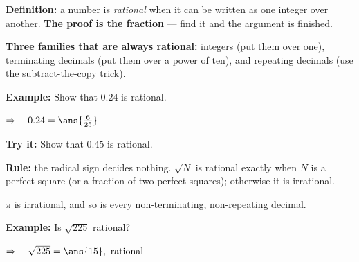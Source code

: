 \documentclass[12pt]{article}
\begin{document}


\begin{formulabox}
\textbf{Definition:} a number is \emph{rational} when it can be written as one integer
over another. \textbf{The proof is the fraction} --- find it and the argument is finished.
\par\smallskip
\textbf{Three families that are always rational:} integers (put them over one),
terminating decimals (put them over a power of ten), and repeating decimals (use the
subtract-the-copy trick).
\end{formulabox}

\begin{examplebox}
\textbf{Example:} \quad Show that $0.24$ is rational.

$\Rightarrow\quad 0.24 = \ans{\tfrac{6}{25}}$
\end{examplebox}

\begin{tryitbox}
\textbf{Try it:} \quad Show that $0.45$ is rational.\\[2pt]
\end{tryitbox}


\begin{formulabox}
\textbf{Rule:} the radical sign decides nothing. $\sqrt{N}$ is rational exactly when $N$
is a perfect square (or a fraction of two perfect squares); otherwise it is irrational.
\par\smallskip
$\pi$ is irrational, and so is every non-terminating, non-repeating decimal.
\end{formulabox}

\begin{examplebox}
\textbf{Example:} \quad Is $\sqrt{225}$ rational?

$\Rightarrow\quad \sqrt{225} = \ans{15}, \text{ rational}$
\end{examplebox}
\end{document}
